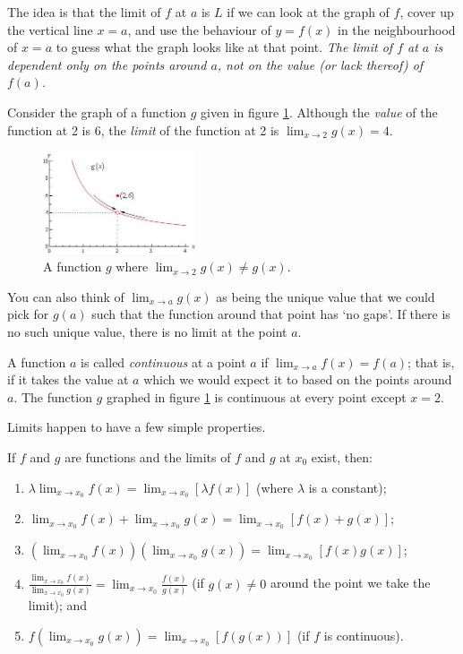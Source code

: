 The idea is that the limit of $ f $ at $ a $ is $ L $ if we can look at the graph of $ f $, cover up
the vertical line $ x = a $, and use the behaviour of $ y = f(x) $ in the neighbourhood of $ x = a $
to guess what the graph looks like at that point. \emph{The limit of $ f $ at $ a $ is dependent only
on the points around $ a $, not on the value (or lack thereof) of $ f(a) $.}

Consider the graph of a function $ g $ given in figure \ref{fig:lim1}. Although the \emph{value} of
the function at 2 is 6, the \emph{limit} of the function at 2 is $ \lim_{x \to 2} g(x) = 4 $.

\begin{figure}
  \centering
  \includegraphics[width=0.4\textwidth]{oslimit2}
  \caption{A function $ g $ where $ \lim_{x \to 2} g(x) \neq g(x) $. \label{fig:lim1}}
\end{figure}

You can also think of $ \lim_{x \to a} g(x) $ as being the unique value that we could pick for $ g(a) $ such that the function
around that point has `no gaps'. If there is no such unique value, there is no limit at the point $ a $.

A function $ a $ is called \emph{continuous} at a point $ a $ if $ \lim_{x \to a} f(x) = f(a) $; that is, if it takes the
value at $ a $ which we would expect it to based on the points around $ a $. The function $ g $ graphed in figure \ref{fig:lim1}
is continuous at every point except $ x = 2 $.

Limits happen to have a few simple properties.
\begin{thm}
  If $ f $ and $ g $ are functions and the limits of $ f $ and $ g $ at $ x_0 $ exist, then:
  \begin{enumerate}
    \item $ \displaystyle \lambda \lim_{x \to x_0} f(x) = \lim_{x \to x_0} [\lambda f(x)] $ (where $ \lambda $ is a constant);
    \item $ \displaystyle \lim_{x \to x_0} f(x) + \lim_{x \to x_0} g(x) = \lim_{x \to x_0} [f(x) + g(x)] $;
    \item $ \displaystyle \left(\lim_{x \to x_0} f(x)\right)\left(\lim_{x \to x_0} g(x)\right) = \lim_{x \to x_0} [f(x)g(x)] $;
    \item $ \displaystyle \frac{\lim_{x \to x_0} f(x)}{\lim_{x \to x_0} g(x)} = \lim_{x \to x_0} \frac{f(x)}{g(x)} $ (if $ g(x) \neq 0 $ around
          the point we take the limit); and
    \item $ \displaystyle f(\lim_{x \to x_0} g(x)) = \lim_{x \to x_0} [f(g(x))] $ (if $ f $ is continuous).
  \end{enumerate}
\end{thm}

